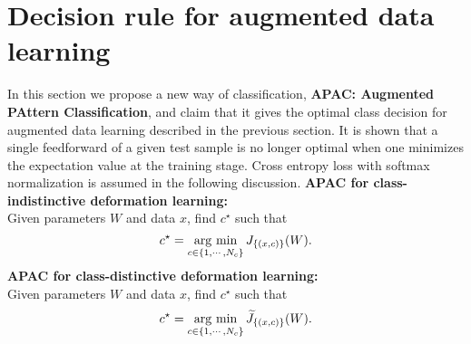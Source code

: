 \documentclass[10pt,twocolumn,letterpaper]{article}
\newcommand{\argmin}{\mathop{\rm arg~min}\limits}
\begin{document}
\section{Decision rule for augmented data learning}

In this section we propose a new way of classification, 
{\bf APAC: Augmented PAttern Classification}, and claim that
it gives the optimal class decision for augmented data learning
described in the previous section.
It is shown that 
a single feedforward of a given test sample is no longer optimal 
when one minimizes the expectation value at the training stage.
Cross entropy loss with softmax normalization is assumed
in the following discussion.
\newline
\newline
{\bf APAC for class-indistinctive deformation learning:} \\
Given parameters $W$ and data $x$, 
find $c^\star$ such that 
\begin{equation}
c^\star = \argmin_{c\in \{1,\cdots, N_c\}} J_{\{(x, c)\}}(W).
\label{APAC-indistinctive}
\end{equation}
\newline
{\bf APAC for class-distinctive deformation learning:} \\
Given parameters $W$ and data $x$, 
find $c^\star$ such that 
\begin{equation}
c^\star = \argmin_{c\in \{1,\cdots, N_c\}} \widetilde{J}_{\{(x, c)\}}(W).
\label{APAC-distinctive}
\end{equation}
\end{document}
